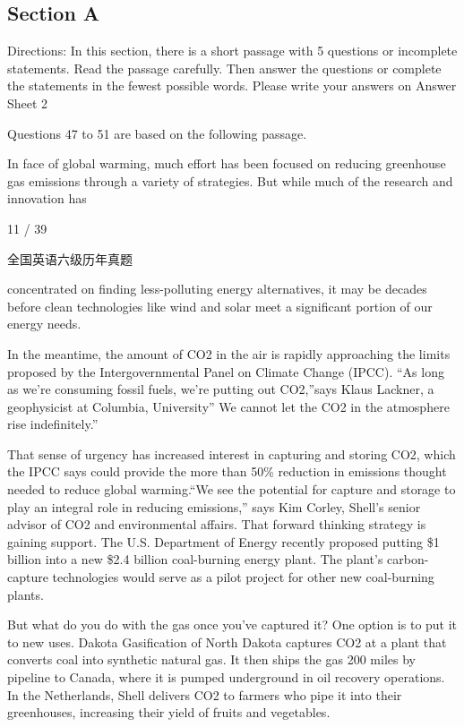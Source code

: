 \documentclass[UTF8,11pt]{ctexart}
\begin{document}
\subsection*{\textbf{Section A}}


Directions: In this section, there is a short passage with 5 questions or incomplete statements. Read the passage carefully. Then answer the questions or complete the statements in the fewest possible words. Please write your answers on Answer Sheet 2


Questions 47 to 51 are based on the following passage.


In face of global warming, much effort has been focused on reducing greenhouse gas emissions through a variety of strategies. But while much of the research and innovation has


11 / 39


全国英语六级历年真题


concentrated on finding less-polluting energy alternatives, it may be decades before clean technologies like wind and solar meet a significant portion of our energy needs.


In the meantime, the amount of CO2 in the air is rapidly approaching the limits proposed by the Intergovernmental Panel on Climate Change (IPCC). “As long as we’re consuming fossil fuels, we’re putting out CO2,”says Klaus Lackner, a geophysicist at Columbia, University” We cannot let the CO2 in the atmosphere rise indefinitely.”


That sense of urgency has increased interest in capturing and storing CO2, which the IPCC says could provide the more than 50\% reduction in emissions thought needed to reduce global warming.“We see the potential for capture and storage to play an integral role in reducing emissions,” says Kim Corley, Shell’s senior advisor of CO2 and environmental affairs. That forward thinking strategy is gaining support. The U.S. Department of Energy recently proposed putting \$1 billion into a new \$2.4 billion coal-burning energy plant. The plant’s carbon-capture technologies would serve as a pilot project for other new coal-burning plants.


But what do you do with the gas once you’ve captured it? One option is to put it to new uses. Dakota Gasification of North Dakota captures CO2 at a plant that converts coal into synthetic natural gas. It then ships the gas 200 miles by pipeline to Canada, where it is pumped underground in oil recovery operations. In the Netherlands, Shell delivers CO2 to farmers who pipe it into their greenhouses, increasing their yield of fruits and vegetables.
\end{document}
